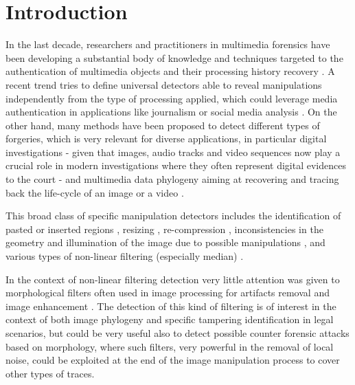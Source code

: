 \documentclass[review]{elsarticle}
\begin{document}
\linenumbers

\section{Introduction}
\label{sec:intro}

In the last decade, researchers and practitioners in multimedia forensics have been developing a substantial body of knowledge and techniques targeted to the authentication of multimedia objects and their processing history recovery \cite{stamm_overview, farid_book, ho, piva_overview, sencar_book}. 
A recent trend tries to define universal detectors able to reveal manipulations independently from the type of processing applied, which could leverage media authentication in applications like journalism or social media analysis \cite{noiseprint}. 
On the other hand, many methods have been proposed to detect different types of forgeries, which is very relevant for diverse applications, in particular digital investigations - given that images, audio tracks and video sequences now play a crucial role in modern investigations where they often represent digital evidences to the court \cite{forlab} - and multimedia data phylogeny aiming at recovering and tracing back the life-cycle of an image or a video \cite{Bestagini2016, Dias2012, Oliveira2016, Costa2014}.

This broad class of specific manipulation detectors includes the identification of pasted or inserted regions \cite{cm2, cm3, cm4, spl2, spl3}, resizing \cite{fernando2017}, re-compression \cite{PBPG2017-TIFS},  inconsistencies in the geometry and illumination of the image due to possible manipulations \cite{geom1, geom2, phys1}, and various types of non-linear filtering (especially median) \cite{Bahrami2015, Cao2014, Cao2011, Fridrich2010, Tian2010, Yuan:2011, Liu2013, Huang2013, Shi2014, Wang2015}. 

In the context of non-linear filtering detection 
very little attention was given to morphological filters \cite{haas1967morphologie} often used in image processing for artifacts removal and image enhancement \cite{British2012} \cite{Maragos2004}. The detection of this kind of filtering is of interest in the context of both image phylogeny and specific tampering identification in legal scenarios, but could be very useful also to detect possible counter forensic attacks based on morphology, where such filters, very powerful in the removal of local noise, could be exploited at the end of the image manipulation process to cover other types of traces. 
\end{document}

